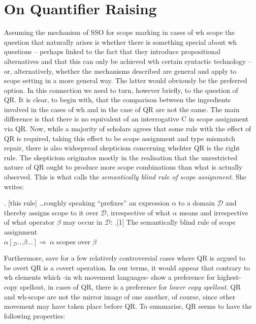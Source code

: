 \documentclass{glossa}
\begin{document}
\section{On Quantifier Raising}
Assuming the mechanism of SSO for scope marking in cases of wh scope the question that naturally arises is whether there is something special about wh questions -- perhaps linked to the fact that they introduce propositional alternatives and that this can only be achieved wth certain syntactic technology -- or, alternatively, whether the mechanisms described are general and apply to scope setting in a more general way.  The latter would obviously be the preferred option.  In this connection we need to turn, however briefly, to the question of QR.  It is clear, to begin with, that the comparison between the ingredients involved in the cases of wh and in the case of QR are not the same.  The main difference is that there is no equivalent of an interrogative C in scope assignment via QR.  Now, while a majority of scholars agrees that some rule with the effect of QR is required, taking this effect to be scope assignment and type mismatch repair, there is also widespread skepticism concerning whehter QR is the right rule.  The skepticism originates mostly in the realisation that the unrestricted nature of QR ought to produce more scope combinations than what is actually observed. This is what\cite{szabolcsi:1997c} calls the
\emph{semantically blind rule of scope assignment}.  She writes:

\ex.  [this rule] \ldots roughly speaking ``prefixes'' an expression
$\alpha$ to a domain $\mathcal{D}$ and thereby assigns scope to it
over $\mathcal{D}$, irrespective of what $\alpha$ means and
irrespective of what operator $\beta$ may occur in $\mathcal{D}$:
\ex.[1] The semantically blind rule of scope assignment\\
 $\alpha[_{\mathcal{D}} \ldots \beta \ldots] \Rightarrow \
\alpha$ scopes over $ \beta$
\begin{flushright}
\cite[109]{szabolcsi:1997c}
\end{flushright}

Furthermore, save for a few relatively controversial cases where QR is argued to be overt \citep{fox-nissenbaum:99} QR is a covert operation.  In our terms, it would appear that contrary to wh elements which -in wh movement languages- show a preference for highest-copy spellout, in cases of QR, there is a preference for  \textit{lower copy spellout}.  QR and wh-scope are not the mirror image of one another, of course, since other movement may have taken place before QR.  To summarise, QR seems to have the following properties:
\end{document}
